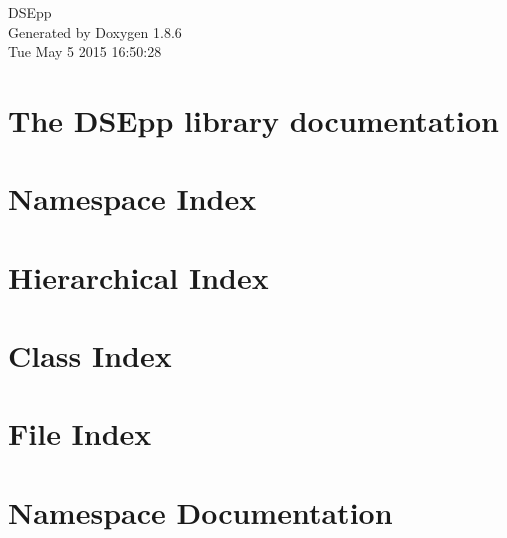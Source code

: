 \documentclass[twoside]{book}
\newcommand{\clearemptydoublepage}{%
  \newpage{\pagestyle{empty}\cleardoublepage}%
}
\begin{document}
\hypersetup{pageanchor=false}
\begin{titlepage}
\vspace*{7cm}
\begin{center}%
{\Large D\-S\-Epp }\\
\vspace*{1cm}
{\large Generated by Doxygen 1.8.6}\\
\vspace*{0.5cm}
{\small Tue May 5 2015 16:50:28}\\
\end{center}
\end{titlepage}
\clearemptydoublepage
\tableofcontents
\clearemptydoublepage
{}
\hypersetup{pageanchor=true}

\chapter{The D\-S\-Epp library documentation}
\label{index}\hypertarget{index}{}
\chapter{Namespace Index}

\chapter{Hierarchical Index}

\chapter{Class Index}

\chapter{File Index}

\chapter{Namespace Documentation}






\end{document}
